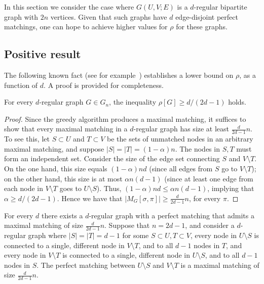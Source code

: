 In this section we consider the case where $G(U,V;E)$ is a $d$-regular bipartite graph with $2n$ vertices. Given that such graphs have $d$
%
edge-disjoint  %
perfect matchings, one can hope to achieve higher values for $\rho$ for these graphs.

\subsection{Positive result}
\label{sec:regular-pos}

The following known %
%
fact %
(see for example~\cite{NaorW15}) establishes a lower bound on $\rho$, as a function of $d$.
A proof is provided for completeness.

\begin{proposition}
	\label{pro:smalld}
For every $d$-regular graph $G \in G_n$, 
%
the inequality  $\rho[G] \ge  d/(2d-1)$ holds.  %
\end{proposition}

\begin{proof}
	Since the greedy algorithm produces a maximal matching, it suffices to show that every maximal matching in a $d$-regular graph has size at least $\frac{d}{2d-1}n$.
	To see this, let $S \subset U$ and $T \subset V$ be the sets of unmatched nodes in an arbitrary maximal matching, and suppose $|S|=|T|=(1-\alpha) n$. The nodes in $S,T$ must form an independent set.
	Consider the size of the edge set connecting $S$ and $V \setminus T$.
	On the one hand, this size equals $(1-\alpha) n d$ (since all edges from $S$ go to $V \setminus T$); on the other hand, this size is at most $\alpha n (d-1)$ (since at least one edge from each node in $V \setminus T$ goes to $U \setminus S$).
	Thus, $(1-\alpha) n d \leq \alpha n (d-1)$, implying that $\alpha \geq d/(2d-1)$.
	Hence we have that $|M_G[\sigma,\pi]| \ge  \frac{d}{2d-1}n$, for every $\pi$.
\end{proof}

\begin{remark}
	For every $d$ there exists a $d$-regular graph with a perfect matching that admits a maximal matching of size $\frac{d}{2d-1}n$. Suppose that $n = 2d-1$, and
consider a $d$-regular graph where $|S|=|T|=d-1$ for some $S \subset U, T \subset V$, every node in $U \setminus S$ is connected to a single, different node in $V \setminus T$, and to all $d-1$ nodes in $T$, and every node in $V \setminus T$ is connected to a single, different node in $U \setminus S$, and to all $d-1$ nodes in $S$. The perfect matching between $U \setminus S$ and $V \setminus T$ is a maximal matching of size $\frac{d}{2d-1}n$.
\end{remark}


